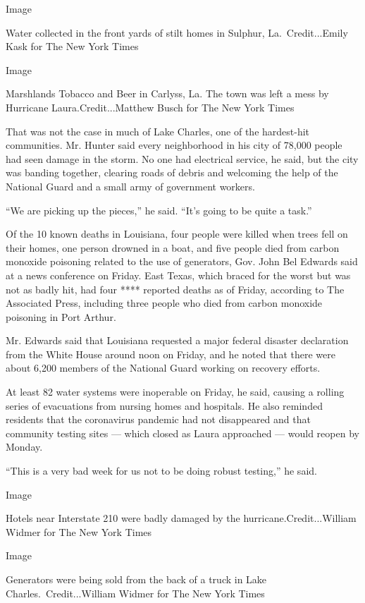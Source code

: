 Image

Water collected in the front yards of stilt homes in Sulphur,
La.~Credit...Emily Kask for The New York Times

Image

Marshlands Tobacco and Beer in Carlyss, La. The town was left a mess by
Hurricane Laura.Credit...Matthew Busch for The New York Times

That was not the case in much of Lake Charles, one of the hardest-hit
communities. Mr. Hunter said every neighborhood in his city of 78,000
people had seen damage in the storm. No one had electrical service, he
said, but the city was banding together, clearing roads of debris and
welcoming the help of the National Guard and a small army of government
workers.

``We are picking up the pieces,'' he said. ``It's going to be quite a
task.''

Of the 10 known deaths in Louisiana, four people were killed when trees
fell on their homes, one person drowned in a boat, and five people died
from carbon monoxide poisoning related to the use of generators, Gov.
John Bel Edwards said at a news conference on Friday. East Texas, which
braced for the worst but was not as badly hit, had four **** reported
deaths as of Friday, according to The Associated Press, including three
people who died from carbon monoxide poisoning in Port Arthur.

Mr. Edwards said that Louisiana requested a major federal disaster
declaration from the White House around noon on Friday, and he noted
that there were about 6,200 members of the National Guard working on
recovery efforts.

At least 82 water systems were inoperable on Friday, he said, causing a
rolling series of evacuations from nursing homes and hospitals. He also
reminded residents that the coronavirus pandemic had not disappeared and
that community testing sites --- which closed as Laura approached ---
would reopen by Monday.

``This is a very bad week for us not to be doing robust testing,'' he
said.

Image

Hotels near Interstate 210 were badly damaged by the
hurricane.Credit...William Widmer for The New York Times

Image

Generators were being sold from the back of a truck in Lake
Charles.~Credit...William Widmer for The New York Times

